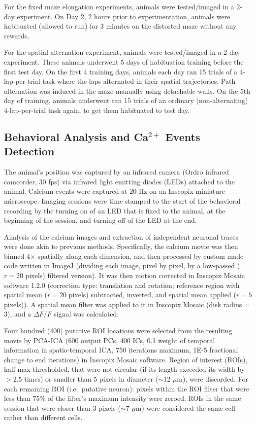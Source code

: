 For the fixed maze elongation experiments, animals were tested/imaged in a 2-day experiment. On Day 2, 2 hours prior to experimentation, animals were habituated (allowed to run) for 3 minutes on the distorted maze without any rewards.

For the spatial alternation experiment, animals were tested/imaged in a 2-day experiment. These animals underwent 5 days of habituation training before the first test day. On the first 4 training days, animals each day ran 15 trials of a 4-lap-per-trial task where the laps alternated in their spatial trajectories. Path alternation was induced in the maze manually using detachable walls. On the 5th day of training, animals underwent ran 15 trials of an ordinary (non-alternating) 4-lap-per-trial task again, to get them habituated to test day.

\subsection{Behavioral Analysis and Ca$^{2+}$ Events Detection}

The animal's position was captured by an infrared camera (Ordro infrared camcorder, 30 fps) via infrared light emitting diodes (LEDs) attached to the animal. Calcium events were captured at 20 Hz on an Inscopix miniature microscope. Imaging sessions were time stamped to the start of the behavioral recording by the turning on of an LED that is fixed to the animal, at the beginning of the session, and turning off of the LED at the end.

Analysis of the calcium images and extraction of independent neuronal traces were done akin to previous methods. Specifically, the calcium movie was then binned 4$\times$ spatially along each dimension, and then processed by custom made code written in ImageJ (dividing each image, pixel by pixel, by a low-passed ($r = 20$ pixels) filtered version). It was then motion corrected in Inscopix Mosaic software 1.2.0 (correction type: translation and rotation; reference region with spatial mean ($r = 20$ pixels) subtracted, inverted, and spatial mean applied ($r = 5$ pixels)). A spatial mean filter was applied to it in Inscopix Mosaic (disk radius = 3), and a $\Delta F/F$ signal was calculated.

Four hundred (400) putative ROI locations were selected from the resulting movie by PCA-ICA (600 output PCs, 400 ICs, 0.1 weight of temporal information in spatio-temporal ICA, 750 iterations maximum, 1E-5 fractional change to end iterations) in Inscopix Mosaic software. Region of interest (ROIs), half-max thresholded, that were not circular (if its length exceeded its width by $> 2.5$ times) or smaller than 5 pixels in diameter ($\sim$12 $\mu$m), were discarded. For each remaining ROI (i.e.\ putative neuron): pixels within the ROI filter that were less than 75\% of the filter's maximum intensity were zeroed. ROIs in the same session that were closer than 3 pixels ($\sim$7 $\mu$m) were considered the same cell rather than different cells.

